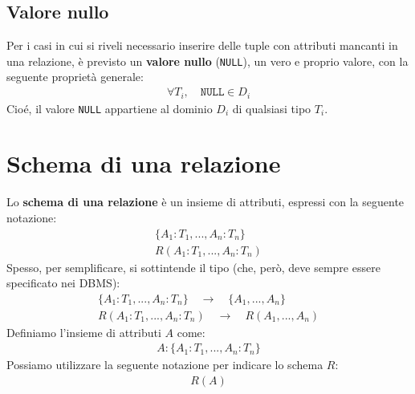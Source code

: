 \subsection{Valore nullo}
Per i casi in cui si riveli necessario inserire delle tuple con attributi mancanti in una relazione, è previsto un \textbf{valore nullo} (\texttt{NULL}), un vero e proprio valore, con la seguente proprietà generale:
    \begin{equation}\begin{aligned}
        \forall T_i, \quad \texttt{NULL} \in D_i
    \end{aligned}\end{equation}
Cioé, il valore \texttt{NULL} appartiene al dominio $D_i$ di qualsiasi tipo $T_i$.

\section{Schema di una relazione}
Lo \textbf{schema di una relazione} è un insieme di attributi, espressi con la seguente notazione:
    \begin{equation}\begin{aligned}
        \{  A_1:T_1, ..., A_n:T_n   \}\\
        R ( A_1:T_1, ..., A_n:T_n   )
    \end{aligned}\end{equation}
Spesso, per semplificare, si sottintende il tipo (che, però, deve sempre essere specificato nei DBMS):
    \begin{equation}\begin{aligned}
        \{  A_1:T_1, ..., A_n:T_n   \}
        \quad \rightarrow \quad
        \{  A_1, ..., A_n   \}\\
        R ( A_1:T_1, ..., A_n:T_n   )
        \quad \rightarrow \quad
        R ( A_1, ..., A_n)
    \end{aligned}\end{equation}  
Definiamo l'insieme di attributi $A$ come:
    \begin{equation}\begin{aligned}
        A: \{  A_1:T_1, ..., A_n:T_n   \}
    \end{aligned}\end{equation}
Possiamo utilizzare la seguente notazione per indicare lo schema $R$:
    \begin{equation}\begin{aligned}
       R(A)
    \end{aligned}\end{equation} 

